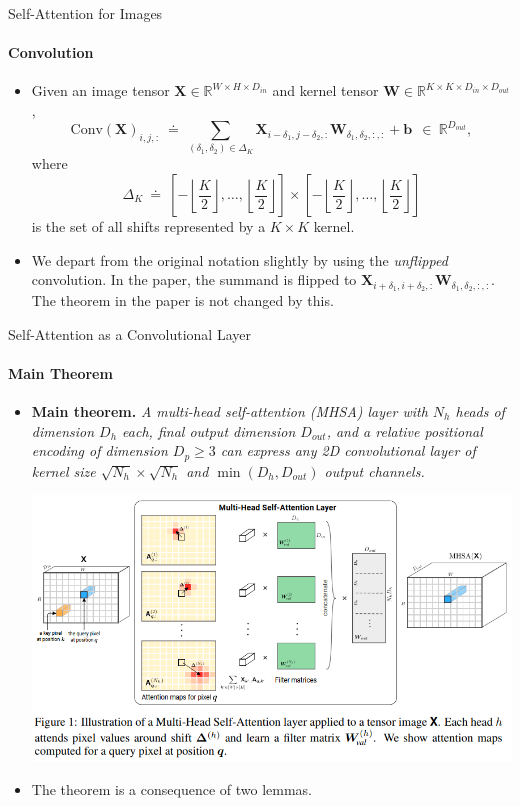 \documentclass[9pt]{beamer}
\newcommand{\bb}{\mathbb}
\newcommand{\mb}{\bm}
\begin{document}
\newcommand{\sqbrkt}[1]{\left[#1\right]}
\newcommand{\ktwo}{\left\lfloor\frac K2\right\rfloor}
\begin{frame}{Self-Attention for Images}
\framesubtitle{Convolution}
\begin{itemize}
\item Given an image tensor $\bm X \in \bb R^{W\times H\times D_{in}}$ and kernel tensor $\bm W \in \bb R^{K\times K \times D_{in} \times D_{out}}$,
\begin{equation}
\mathrm{Conv}(\mb X)_{i,j,:} \ \doteq \ \sum_{(\delta_1, \delta_2) \in \Delta_K} \mb X_{i-\delta_1, j-\delta_2, :} \mb W_{\delta_1, \delta_2, :, :} + \mb b \ \ \in \ \mathbb R^{D_{out}},
\end{equation}
where
$$\Delta_K \ \doteq \ \sqbrkt{-\ktwo, \dots, \ktwo} \times \sqbrkt{-\ktwo, \dots, \ktwo}$$
is the set of all shifts represented by a $K\times K$ kernel.

\vspace{.1in}
\item We depart from the original notation slightly by using the {\em unflipped} convolution. In the paper, the summand is flipped to $\bm X_{i+\delta_1, i+\delta_2,:} \bm W_{\delta_1, \delta_2,:,:}$. The theorem in the paper is not changed by this.
\end{itemize}
\end{frame}


\begin{frame}{Self-Attention as a Convolutional Layer}
\framesubtitle{Main Theorem}
\begin{itemize}
\item \textbf{Main theorem.} \emph{A {\em multi-head self-attention} (MHSA) layer with $N_h$ heads of dimension $D_h$ each, final output dimension $D_{out}$, and a {\em relative positional encoding} of dimension $D_p\geq3$ can express any 2D convolutional layer of kernel size $\sqrt{N_h}\times\sqrt{N_h}$ and $\min(D_h, D_{out})$ output channels.}

\begin{center}
    \includegraphics[width=.8\textwidth]{presentation/images/sa_as_conv.png}
\end{center}
\vspace{-.15in}

\item The theorem is a consequence of two lemmas.
\end{itemize}
\end{frame}
\end{document}
